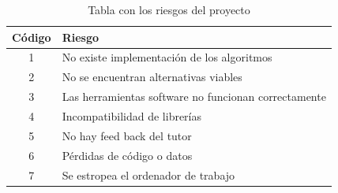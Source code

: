 \begin{table}[H]
\centering
\begin{tabular}{|c|l|}
\hline
\rowcolor[HTML]{C0C0C0} 
{\color[HTML]{000000} \textbf{Código}} & {\color[HTML]{000000} \textbf{Riesgo}}                       \\ \hline
\rowcolor[HTML]{EFEFEF} 
{\color[HTML]{000000} 1} & {\color[HTML]{000000} No existe implementación de los algoritmos}           \\ \hline
\rowcolor[HTML]{EFEFEF} 
{\color[HTML]{000000} 2}               & {\color[HTML]{000000} No se encuentran alternativas viables} \\ \hline
\rowcolor[HTML]{EFEFEF} 
{\color[HTML]{000000} 3} & {\color[HTML]{000000} Las herramientas software no funcionan correctamente} \\ \hline
\rowcolor[HTML]{EFEFEF} 
{\color[HTML]{000000} 4}               & {\color[HTML]{000000} Incompatibilidad de librerías}         \\ \hline
\rowcolor[HTML]{EFEFEF} 
{\color[HTML]{000000} 5}               & {\color[HTML]{000000} No hay feed back del tutor}            \\ \hline
\rowcolor[HTML]{EFEFEF} 
{\color[HTML]{000000} 6}               & {\color[HTML]{000000} Pérdidas de código o datos}            \\ \hline
\rowcolor[HTML]{EFEFEF} 
{\color[HTML]{000000} 7}               & {\color[HTML]{000000} Se estropea el ordenador de trabajo}   \\ \hline
\end{tabular}
\caption{Tabla con los riesgos del proyecto}
\end{table}

